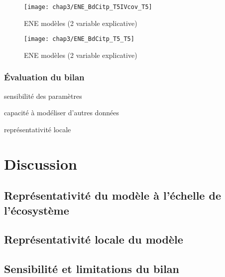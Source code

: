 \begin{figure}
\centering
\texttt{[image: chap3/ENE\_BdCitp\_T5IVcov\_T5]}
\caption{ENE modèles (2 variable explicative)}
\label{fig:ENE_BdC_T5IVcov-T5_mod_mes}
\end{figure}

\begin{figure}
\centering
\texttt{[image: chap3/ENE\_BdCitp\_T5\_T5]}
\caption{ENE modèles (2 variable explicative)}
\label{fig:ENE_BdC_T5-T5_mod_mes}
\end{figure}




\subsubsection{Évaluation du bilan}

sensibilité des paramètres

capacité à modéliser d'autres données

représentativité locale

\section{Discussion}

\subsection{Représentativité du modèle à l'échelle de l'écosystème}

\subsection{Représentativité locale du modèle}

\subsection{Sensibilité et limitations du bilan}


